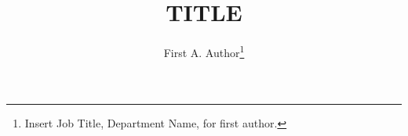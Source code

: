\documentclass[journal]{new-aiaa} %
\title{TITLE}
\author{First A. Author\footnote{Insert Job Title, Department Name, for first author.}}
\affil{Business or Academic Affiliation 1, City, State, Zip Code}
\begin{document}
\maketitle %

\begin{abstract}
	
	









	
	
	
		
		
		
		
		
		
		
	
	

\end{abstract}



\end{document}
